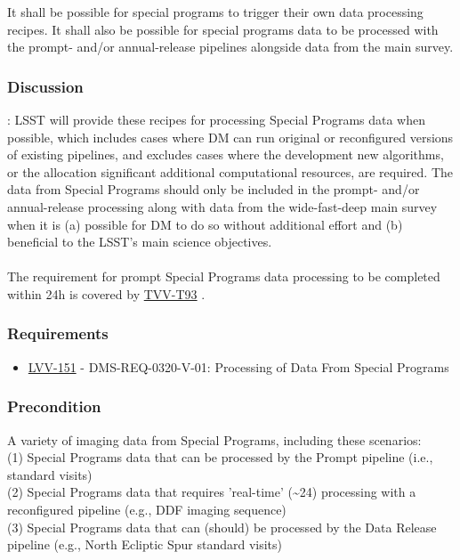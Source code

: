 It shall be possible for special programs to trigger their own data
processing recipes. It shall also be possible for special programs data
to be processed with the prompt- and/or annual-release pipelines
alongside data from the main survey.\\

\hypertarget{discussion}{%
\subsubsection{Discussion}\label{discussion}}

: LSST will provide these recipes for processing Special Programs data
when possible, which includes cases where DM can run original or
reconfigured versions of existing pipelines, and excludes cases where
the development new algorithms, or the allocation significant additional
computational resources, are required. The data from Special Programs
should only be included in the prompt- and/or annual-release processing
along with data from the wide-fast-deep main survey when it is (a)
possible for DM to do so without additional effort and (b) beneficial to
the LSST's main science objectives.\\
~\\
The requirement for prompt Special Programs data processing to be
completed within 24h is covered by
\href{https://jira.lsstcorp.org/secure/Tests.jspa\#/testCase/LVV-T93}{TVV-T93}
.

\hypertarget{requirements-69}{%
\subsubsection{Requirements}\label{requirements-69}}

\begin{itemize}
\tightlist
\item
  \href{https://jira.lsstcorp.org/browse/LVV-151}{LVV-151} -
  DMS-REQ-0320-V-01: Processing of Data From Special Programs
\end{itemize}

\hypertarget{precondition-11}{%
\subsubsection{Precondition}\label{precondition-11}}

A variety of imaging data from Special Programs, including these
scenarios:\\
(1) Special Programs data that can be processed by the Prompt pipeline
(i.e., standard visits)\\
(2) Special Programs data that requires 'real-time'
(\textasciitilde{}24) processing with a reconfigured pipeline (e.g., DDF
imaging sequence)\\
(3) Special Programs data that can (should) be processed by the Data
Release pipeline (e.g., North Ecliptic Spur standard visits)

